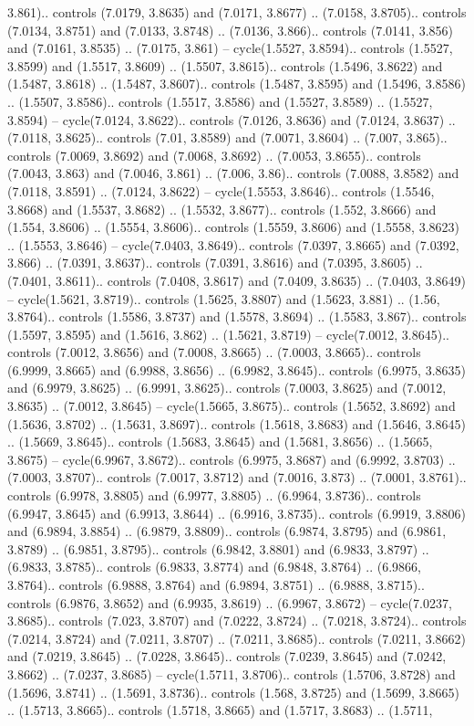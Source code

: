 3.861).. controls (7.0179, 3.8635) and (7.0171, 3.8677) .. (7.0158, 3.8705).. controls (7.0134, 3.8751) and (7.0133, 3.8748) .. (7.0136, 3.866).. controls (7.0141, 3.856) and (7.0161, 3.8535) .. (7.0175, 3.861) -- cycle(1.5527, 3.8594).. controls (1.5527, 3.8599) and (1.5517, 3.8609) .. (1.5507, 3.8615).. controls (1.5496, 3.8622) and (1.5487, 3.8618) .. (1.5487, 3.8607).. controls (1.5487, 3.8595) and (1.5496, 3.8586) .. (1.5507, 3.8586).. controls (1.5517, 3.8586) and (1.5527, 3.8589) .. (1.5527, 3.8594) -- cycle(7.0124, 3.8622).. controls (7.0126, 3.8636) and (7.0124, 3.8637) .. (7.0118, 3.8625).. controls (7.01, 3.8589) and (7.0071, 3.8604) .. (7.007, 3.865).. controls (7.0069, 3.8692) and (7.0068, 3.8692) .. (7.0053, 3.8655).. controls (7.0043, 3.863) and (7.0046, 3.861) .. (7.006, 3.86).. controls (7.0088, 3.8582) and (7.0118, 3.8591) .. (7.0124, 3.8622) -- cycle(1.5553, 3.8646).. controls (1.5546, 3.8668) and (1.5537, 3.8682) .. (1.5532, 3.8677).. controls (1.552, 3.8666) and (1.554, 3.8606) .. (1.5554, 3.8606).. controls (1.5559, 3.8606) and (1.5558, 3.8623) .. (1.5553, 3.8646) -- cycle(7.0403, 3.8649).. controls (7.0397, 3.8665) and (7.0392, 3.866) .. (7.0391, 3.8637).. controls (7.0391, 3.8616) and (7.0395, 3.8605) .. (7.0401, 3.8611).. controls (7.0408, 3.8617) and (7.0409, 3.8635) .. (7.0403, 3.8649) -- cycle(1.5621, 3.8719).. controls (1.5625, 3.8807) and (1.5623, 3.881) .. (1.56, 3.8764).. controls (1.5586, 3.8737) and (1.5578, 3.8694) .. (1.5583, 3.867).. controls (1.5597, 3.8595) and (1.5616, 3.862) .. (1.5621, 3.8719) -- cycle(7.0012, 3.8645).. controls (7.0012, 3.8656) and (7.0008, 3.8665) .. (7.0003, 3.8665).. controls (6.9999, 3.8665) and (6.9988, 3.8656) .. (6.9982, 3.8645).. controls (6.9975, 3.8635) and (6.9979, 3.8625) .. (6.9991, 3.8625).. controls (7.0003, 3.8625) and (7.0012, 3.8635) .. (7.0012, 3.8645) -- cycle(1.5665, 3.8675).. controls (1.5652, 3.8692) and (1.5636, 3.8702) .. (1.5631, 3.8697).. controls (1.5618, 3.8683) and (1.5646, 3.8645) .. (1.5669, 3.8645).. controls (1.5683, 3.8645) and (1.5681, 3.8656) .. (1.5665, 3.8675) -- cycle(6.9967, 3.8672).. controls (6.9975, 3.8687) and (6.9992, 3.8703) .. (7.0003, 3.8707).. controls (7.0017, 3.8712) and (7.0016, 3.873) .. (7.0001, 3.8761).. controls (6.9978, 3.8805) and (6.9977, 3.8805) .. (6.9964, 3.8736).. controls (6.9947, 3.8645) and (6.9913, 3.8644) .. (6.9916, 3.8735).. controls (6.9919, 3.8806) and (6.9894, 3.8854) .. (6.9879, 3.8809).. controls (6.9874, 3.8795) and (6.9861, 3.8789) .. (6.9851, 3.8795).. controls (6.9842, 3.8801) and (6.9833, 3.8797) .. (6.9833, 3.8785).. controls (6.9833, 3.8774) and (6.9848, 3.8764) .. (6.9866, 3.8764).. controls (6.9888, 3.8764) and (6.9894, 3.8751) .. (6.9888, 3.8715).. controls (6.9876, 3.8652) and (6.9935, 3.8619) .. (6.9967, 3.8672) -- cycle(7.0237, 3.8685).. controls (7.023, 3.8707) and (7.0222, 3.8724) .. (7.0218, 3.8724).. controls (7.0214, 3.8724) and (7.0211, 3.8707) .. (7.0211, 3.8685).. controls (7.0211, 3.8662) and (7.0219, 3.8645) .. (7.0228, 3.8645).. controls (7.0239, 3.8645) and (7.0242, 3.8662) .. (7.0237, 3.8685) -- cycle(1.5711, 3.8706).. controls (1.5706, 3.8728) and (1.5696, 3.8741) .. (1.5691, 3.8736).. controls (1.568, 3.8725) and (1.5699, 3.8665) .. (1.5713, 3.8665).. controls (1.5718, 3.8665) and (1.5717, 3.8683) .. (1.5711, 